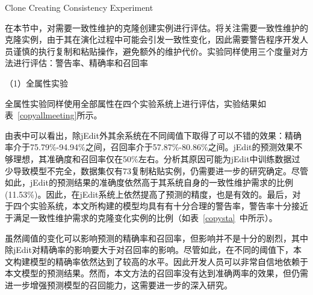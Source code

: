{Clone Creating Consistency Experiment}

在本节中，对需要一致性维护的克隆创建实例进行评估。将关注需要一致性维护的克隆实例，由于其在演化过程中可能会引发一致性变化，因此需要警告程序开发人员谨慎的执行复制和粘贴操作，避免额外的维护代价。实验同样使用三个度量对方法进行评估：警告率、精确率和召回率

（1）全属性实验

全属性实验同样使用全部属性在四个实验系统上进行评估，实验结果如表~\ref{copyallmeeting}所示。

由表中可以看出，除jEdit外其余系统在不同阈值下取得了可以不错的效果：精确率介于75.79\%-94.94\%之间，召回率介于57.87\%-80.86\%之间。jEdit的预测效果不够理想，其准确度和召回率仅在50\%左右。分析其原因可能为jEdit中训练数据过少导致模型不完全，数据集仅有73复制粘贴实例，仍需要进一步的研究确定。尽管如此，jEdit的预测结果的准确度依然高于其系统自身的一致性维护需求的比例(11.53\%)。因此，在jEdit系统上依然提高了预测的精度，也是有效的。最后，对于四个实验系统，本文所构建的模型均具有有十分合理的警告率，警告率十分接近于满足一致性维护需求的克隆变化实例的比例（如表~\ref {copysta}~中所示）。

虽然阈值的变化可以影响预测的精确率和召回率，但影响并不是十分的剧烈，其中除jEdit对精确率的影响要大于对召回率的影响。尽管如此，在不同的阈值下，本文构建模型的精确率依然达到了较高的水平。因此开发人员可以非常自信地依赖于本文模型的预测结果。然而，本文方法的召回率没有达到准确两率的效果，但仍需进一步增强预测模型的召回能力，这需要进一步的深入研究。


